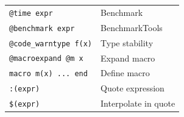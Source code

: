 \documentclass[10pt]{extarticle}
\begin{document}
\begin{multicols}{2}
\begin{tabularx}{\linewidth}{@{}l@{\enspace}Y@{}}
\texttt{@time expr}                & Benchmark \\
\texttt{@benchmark expr}          & BenchmarkTools \\
\texttt{@code\_warntype f(x)}     & Type stability \\
\texttt{@macroexpand @m x}        & Expand macro \\
\texttt{macro m(x) ... end}       & Define macro \\
\texttt{:(expr)}                   & Quote expression \\
\texttt{\$(expr)}                  & Interpolate in quote \\
\end{tabularx}

\end{multicols}

\newpage

\end{document}
